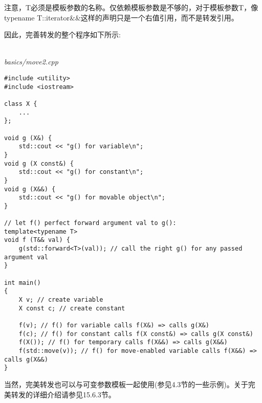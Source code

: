 注意，T必须是模板参数的名称。仅依赖模板参数是不够的，对于模板参数T，像typename T::iterator\&\&这样的声明只是一个右值引用，而不是转发引用。

因此，完善转发的整个程序如下所示:

\hspace*{\fill} \\ %
\noindent
\textit{basics/move2.cpp}
\begin{lstlisting}[style=styleCXX]
#include <utility>
#include <iostream>

class X {
	...
};

void g (X&) {
	std::cout << "g() for variable\n";
}
void g (X const&) {
	std::cout << "g() for constant\n";
}
void g (X&&) {
	std::cout << "g() for movable object\n";
}

// let f() perfect forward argument val to g():
template<typename T>
void f (T&& val) {
	g(std::forward<T>(val)); // call the right g() for any passed argument val
}

int main()
{
	X v; // create variable
	X const c; // create constant
	
	f(v); // f() for variable calls f(X&) => calls g(X&)
	f(c); // f() for constant calls f(X const&) => calls g(X const&)
	f(X()); // f() for temporary calls f(X&&) => calls g(X&&)
	f(std::move(v)); // f() for move-enabled variable calls f(X&&) => calls g(X&&)
}
\end{lstlisting}

当然，完美转发也可以与可变参数模板一起使用(参见4.3节的一些示例)。关于完美转发的详细介绍请参见15.6.3节。





